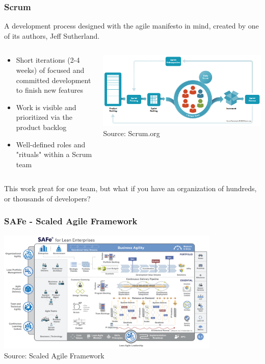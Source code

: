 \begin{frame}
\frametitle{Scrum}
A development process designed with the agile manifesto in mind, created by 
one of its authors, Jeff Sutherland.
\begin{columns}[]
    \begin{column}{0.5\textwidth}
        \begin{itemize}
            \item Short iterations (2-4 weeks) of focused and committed
                development to finish new features
            \item Work is visible and prioritized via the product backlog
            \item Well-defined roles and "rituals" within a Scrum team
        \end{itemize}
    \end{column}
    \begin{column}{0.5\textwidth}
        \centering
        \includegraphics[width=\textwidth]{images/scrum.png}\\
        \footnotesize Source: Scrum.org\footnotemark[1]
    \end{column}
\end{columns}
\begin{block}{}
This work great for one team, but what if you have an organization of hundreds,
or thousands of developers?
\end{block}
\end{frame}

\begin{frame}
\frametitle{SAFe - Scaled Agile Framework}
\centering
\includegraphics[width=0.8\textwidth]{images/agile-safe.png}\\
\footnotesize Source: Scaled Agile Framework\footnotemark[1]
\end{frame}

